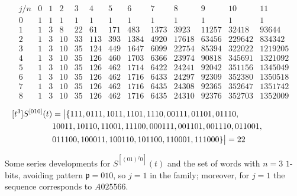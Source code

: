 \begin{table}
\begin{equation*}\begin{array}{c|cccccccccccc}j/n & 0 & 1 & 2 & 3 & 4 & 5 & 6 & 7 & 8 & 9 & 10 & 11\\\hline0 & 1 & 1 & 1 & 1 & 1 & 1 & 1 & 1 & 1 & 1 & 1 & 1\\1 & 1 & 3 & 8 & 22 & 61 & 171 & 483 & 1373 & 3923 & 11257 & 32418 & 93644\\2 & 1 & 3 & 10 & 33 & 113 & 393 & 1384 & 4920 & 17618 & 63456 & 229642 & 834342\\3 & 1 & 3 & 10 & 35 & 124 & 449 & 1647 & 6099 & 22754 & 85394 & 322022 & 1219205\\4 & 1 & 3 & 10 & 35 & 126 & 460 & 1703 & 6366 & 23974 & 90818 & 345691 & 1321092\\5 & 1 & 3 & 10 & 35 & 126 & 462 & 1714 & 6422 & 24241 & 92042 & 351156 & 1345049\\6 & 1 & 3 & 10 & 35 & 126 & 462 & 1716 & 6433 & 24297 & 92309 & 352380 & 1350518\\7 & 1 & 3 & 10 & 35 & 126 & 462 & 1716 & 6435 & 24308 & 92365 & 352647 & 1351742\\8 & 1 & 3 & 10 & 35 & 126 & 462 & 1716 & 6435 & 24310 & 92376 & 352703 & 1352009\end{array}\end{equation*}

\begin{displaymath}
    \hspace{-1.5cm}
    \begin{split}
    [t^{3}]S^{[010]}(t) &= \big|\lbrace 111, 0111, 1011, 1101, 1110, 00111, 01101, 01110, \\
            & 10011, 10110, 11001, 11100, 000111, 001101, 001110, 011001, \\
            & 011100, 100011, 100110, 101100, 110001, 111000 \rbrace\big| = 22
    \end{split}
\end{displaymath}

\caption{Some series developments for $S^{[(01)^{j}0]}(t)$ and the set of words
with $n=3$ $1$-bits, avoiding pattern $\mathfrak{p}=010$, so $j=1$ in the family;
moreover, for $j=1$ the sequence corresponds to $A025566$.}
\label{tbl:S01_j:0}
\end{table}



